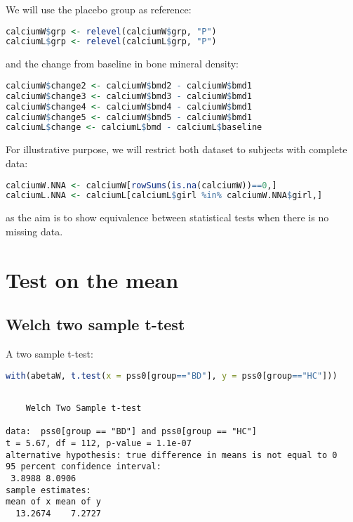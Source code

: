 \documentclass[12pt]{article}
\begin{document}
We will use the placebo group as reference:
\begin{lstlisting}[language=r,numbers=none]
calciumW$grp <- relevel(calciumW$grp, "P")
calciumL$grp <- relevel(calciumL$grp, "P")
\end{lstlisting}

and the change from baseline in bone mineral density:
\begin{lstlisting}[language=r,numbers=none]
calciumW$change2 <- calciumW$bmd2 - calciumW$bmd1
calciumW$change3 <- calciumW$bmd3 - calciumW$bmd1
calciumW$change4 <- calciumW$bmd4 - calciumW$bmd1
calciumW$change5 <- calciumW$bmd5 - calciumW$bmd1
calciumL$change <- calciumL$bmd - calciumL$baseline
\end{lstlisting}


For illustrative purpose, we will restrict both dataset to subjects
with complete data:
\begin{lstlisting}[language=r,numbers=none]
calciumW.NNA <- calciumW[rowSums(is.na(calciumW))==0,]
calciumL.NNA <- calciumL[calciumL$girl %in% calciumW.NNA$girl,]
\end{lstlisting}

as the aim is to show equivalence between statistical tests when there
is no missing data. 

\clearpage
\section{Test on the mean}
\label{sec:org2658eab}
\subsection{Welch two sample t-test}
\label{sec:org3c5211e}

A two sample t-test:
\begin{lstlisting}[language=r,numbers=none]
with(abetaW, t.test(x = pss0[group=="BD"], y = pss0[group=="HC"]))
\end{lstlisting}

\label{}
\begin{verbatim}

	Welch Two Sample t-test

data:  pss0[group == "BD"] and pss0[group == "HC"]
t = 5.67, df = 112, p-value = 1.1e-07
alternative hypothesis: true difference in means is not equal to 0
95 percent confidence interval:
 3.8988 8.0906
sample estimates:
mean of x mean of y 
  13.2674    7.2727
\end{verbatim}
\end{document}
